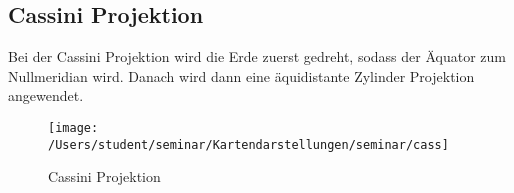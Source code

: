 \subsection{Cassini Projektion}
\label{sec:cassini}
Bei der Cassini Projektion wird die Erde zuerst gedreht, sodass der Äquator zum Nullmeridian wird.
Danach wird dann eine äquidistante Zylinder Projektion angewendet. \\

\begin{figure}[hbtp]
\centering
\texttt{[image: /Users/student/seminar/Kartendarstellungen/seminar/cass]} \caption{Cassini Projektion}
\end{figure}
\newpage 
